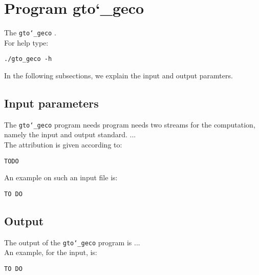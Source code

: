 \section{Program gto\char`_geco}
The \texttt{gto\char`_geco} .\\
For help type:
\begin{lstlisting}
./gto_geco -h
\end{lstlisting}
In the following subsections, we explain the input and output paramters.

\subsection*{Input parameters}

The \texttt{gto\char`_geco} program needs program needs two streams for the computation, namely the input and output standard. ...\\
The attribution is given according to:
\begin{lstlisting}
TODO
\end{lstlisting}
An example on such an input file is:
\begin{lstlisting}
TO DO
\end{lstlisting}

\subsection*{Output}
The output of the \texttt{gto\char`_geco} program is ...\\
An example, for the input, is:
\begin{lstlisting}
TO DO
\end{lstlisting}
